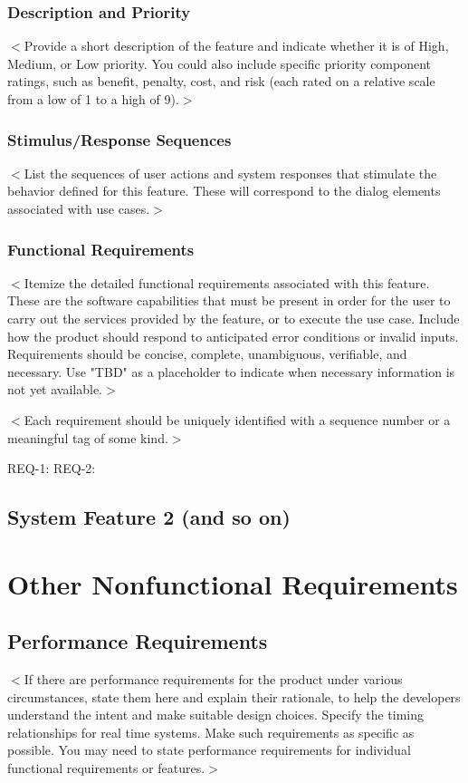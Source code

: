 \documentclass[a4paper, 11pt]{scrreprt}
\begin{document}
\subsection{Description and Priority}
$<$Provide a short description of the feature and indicate whether it is of 
High, Medium, or Low priority. You could also include specific priority 
component ratings, such as benefit, penalty, cost, and risk (each rated on a 
relative scale from a low of 1 to a high of 9).$>$

\subsection{Stimulus/Response Sequences}
$<$List the sequences of user actions and system responses that stimulate the 
behavior defined for this feature. These will correspond to the dialog elements 
associated with use cases.$>$

\subsection{Functional Requirements}
$<$Itemize the detailed functional requirements associated with this feature.  
These are the software capabilities that must be present in order for the user 
to carry out the services provided by the feature, or to execute the use case.  
Include how the product should respond to anticipated error conditions or 
invalid inputs. Requirements should be concise, complete, unambiguous, 
verifiable, and necessary. Use "TBD" as a placeholder to indicate when necessary 
information is not yet available.$>$

$<$Each requirement should be uniquely identified with a sequence number or a 
meaningful tag of some kind.$>$

REQ-1:	REQ-2:

\section{System Feature 2 (and so on)}


\chapter{Other Nonfunctional Requirements}

\section{Performance Requirements}
$<$If there are performance requirements for the product under various 
circumstances, state them here and explain their rationale, to help the 
developers understand the intent and make suitable design choices. Specify the 
timing relationships for real time systems. Make such requirements as specific 
as possible. You may need to state performance requirements for individual 
functional requirements or features.$>$
\end{document}
